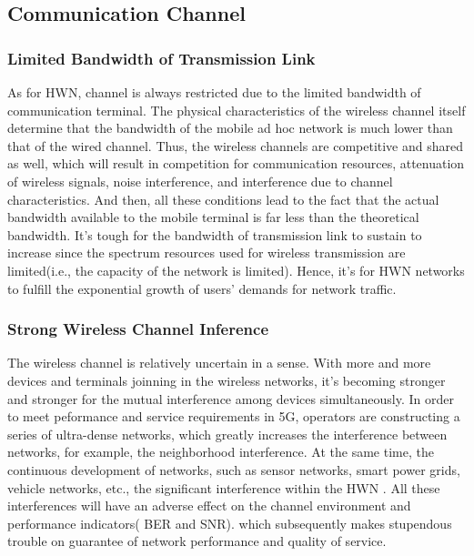 \documentclass[journal,comsoc]{IEEEtran}
\begin{document}
		\subsection{Communication Channel}
			\subsubsection{Limited Bandwidth of Transmission Link}
				As for HWN, channel is always restricted due to the limited bandwidth of communication terminal.
				The physical characteristics of the wireless channel itself determine that the bandwidth of the mobile ad hoc network 
				is much lower than that of the wired channel. 
				Thus, the wireless channels are competitive and shared as well, which will result in competition for communication resources, 
				attenuation of wireless signals, noise interference, and interference due to channel characteristics.
				And then, all these conditions lead to the fact that the actual bandwidth available to the mobile terminal is far less than the theoretical bandwidth.
				It's tough for the bandwidth of transmission link to sustain to increase since the spectrum resources used for wireless transmission are limited(i.e., the capacity of the network is limited).
				Hence, it's  for HWN networks to fulfill the exponential growth of users' demands for network traffic.
			
			\subsubsection{Strong Wireless Channel Inference}
				The wireless channel is relatively uncertain in a sense.
				With more and more devices and terminals joinning in the wireless networks, it's becoming stronger and stronger for the mutual interference among devices simultaneously.
				In order to meet peformance and service requirements in 5G, operators are constructing a series of ultra-dense networks, 
				which greatly increases the interference between networks, for example, the neighborhood interference.
				At the same time, the continuous development of networks, such as sensor networks, smart power grids, vehicle networks, etc., 
				the significant interference within the HWN . 
				All these interferences will have an adverse effect on the channel environment and performance indicators( BER and SNR). 
				which subsequently makes stupendous trouble on guarantee of network performance and quality of service.
		
\end{document}

